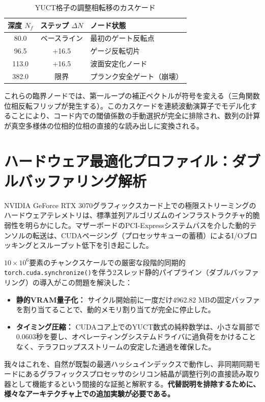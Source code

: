 \documentclass[11pt,a4paper]{article}
\begin{document}
	\begin{table}[h!]
		\centering
		\caption{YUCT格子の調整相転移のカスケード}
		\label{tab:phase_transitions}
		\small
		\begin{tabular}{ccl}
			\toprule
			\textbf{深度 $N_f$} & \textbf{ステップ $\Delta N$} & \textbf{ノード状態} \\
			\midrule
			80.0  & ベースライン & 最初のゲート反転点 \\
			96.5  & +16.5 & ゲージ反転切片 \\
			113.0 & +16.5 & 波面安定化ノード \\
			382.0 & 限界  & プランク安全ゲート（崩壊） \\
			\bottomrule
		\end{tabular}
	\end{table}
	
	これらの臨界ノードでは、第一ループの補正ベクトルが符号を変える（三角関数位相反転フリップが発生する）。このカスケードを連続波動演算子でモデル化することにより、コード内での閾値係数の手動選択が完全に排除され、数列の計算が真空多様体の位相的位相の直接的な読み出しに変換される。
	
	\section{ハードウェア最適化プロファイル：ダブルバッファリング解析}
	NVIDIA GeForce RTX 3070グラフィックスカード上での極限ストリーミングのハードウェアテレメトリは、標準並列アルゴリズムのインフラストラクチャ的脆弱性を明らかにした。マザーボードのPCI-Expressシステムバスを介した動的テンソルの転送は、CUDAページング（プロセッサキューの蓄積）によるI/Oブロッキングとスループット低下を引き起こした。
	
	$10 \times 10^6$要素のチャンクスケールでの厳密な段階的同期的\texttt{torch.cuda.synchronize()}を伴う2スレッド静的パイプライン（ダブルバッファリング）の導入がこの問題を解決した：
	\begin{itemize}
		\item \textbf{静的VRAM量子化：} サイクル開始前に一度だけ$4962.82$ MBの固定バッファを割り当てることで、動的メモリ割り当てが完全に停止した。
		\item \textbf{タイミング圧縮：} CUDAコア上でのYUCT数式の純粋数学は、小さな肩部で$0.0603$秒を要し、オペレーティングシステムドライバに過負荷をかけることなく、テラフロップスストリームの安定した通過を確保した。
	\end{itemize}
	我々はこれを、自然が既製の最適ハッシュインデックスで動作し、非同期同期モードにあるグラフィックスプロセッサのシリコン結晶が調整行列の直接読み取り器として機能するという間接的な証拠と解釈する。\textbf{代替説明を排除するために、様々なアーキテクチャ上での追加実験が必要である。}
	
\end{document}
